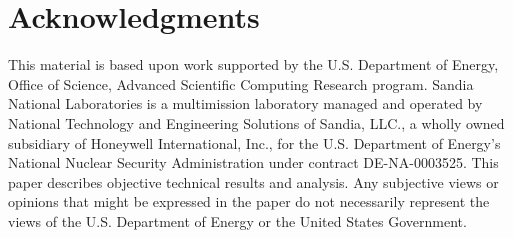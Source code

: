 \documentclass[12pt,reqno]{article}
\begin{document}
\section*{Acknowledgments}
This material is based upon work supported by the U.S. Department of Energy, Office of Science, Advanced Scientific Computing Research program. Sandia National Laboratories is a multimission laboratory managed and operated by National Technology and Engineering Solutions of Sandia, LLC., a wholly owned subsidiary of Honeywell International, Inc., for the U.S. Department of Energy's National Nuclear Security Administration under contract DE-NA-0003525. This paper describes objective technical results and analysis. Any subjective views or opinions that might be expressed in the paper do not necessarily represent the views of the U.S. Department of Energy or the United States Government.
\end{document}
